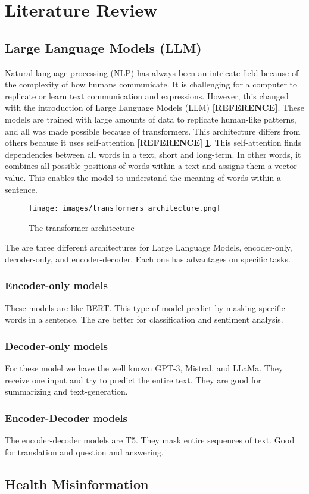 \documentclass[chapters]{IEEEtran}
\begin{document}
\section{Literature Review}

\subsection{Large Language Models (LLM)}
Natural language processing (NLP) has always been an intricate field because of the complexity of how humans communicate.
It is challenging for a computer to replicate or learn text communication and expressions. However, this changed with the introduction
of Large Language Models (LLM) \textbf{[REFERENCE]}. These models are trained with large amounts of data to replicate human-like patterns,
and all was made possible because of transformers. This architecture differs from others because it uses self-attention \textbf{[REFERENCE]} \ref{transformer}.
This self-attention finds dependencies between all words in a text, short and long-term. In other words, it combines all possible 
positions of words within a text and assigns them a vector value. This enables the model to understand the meaning of words within a sentence. 

\begin{figure}[!htb]
    \centering
        \texttt{[image: images/transformers\_architecture.png]}
        \caption{The transformer architecture}
        \label{transformer}
\end{figure}



The are three different architectures for Large Language Models, encoder-only, decoder-only, and encoder-decoder. Each one has advantages on specific tasks.

\subsubsection{Encoder-only models}
These models are like BERT.
This type of model predict by masking specific words in a sentence.
The are better for classification and sentiment analysis.

\subsubsection{Decoder-only models}
For these model we have the well known GPT-3, Mistral, and LLaMa.
They receive one input and try to predict the entire text.
They are good for summarizing and text-generation.


\subsubsection{Encoder-Decoder models}
The encoder-decoder models are T5.
They mask entire sequences of text.
Good for translation and question and answering. \cite{9906925}

\subsection{Health Misinformation}

\printbibliography %
\end{document}
